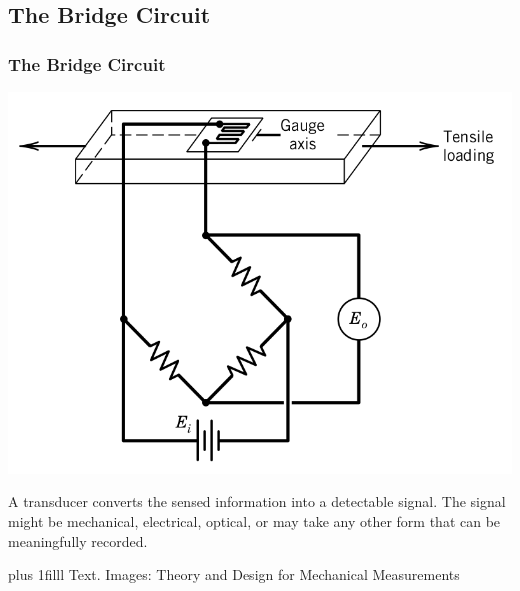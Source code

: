 \documentclass[fleqn]{beamer} %
\newcommand{\sectionIIsubsectionIItitle}{The Bridge Circuit}
\newcommand{\btVFill}{\vskip0pt plus 1filll}
\begin{document}
		\subsection{\sectionIIsubsectionIItitle}\label{sectionIIsubsectionII}

			\begin{frame}
				\frametitle{\sectionIIsubsectionIItitle} \scriptsize
				\bigskip

				\begin{multicols}{2}

				\includegraphics[scale=.25]{images/gauged_beam_bridge.png} \vspace{15mm} 

				A {\PR transducer} converts the sensed information into a detectable signal. The signal might be mechanical, electrical, optical, or may take any other form that can be meaningfully recorded.

				\end{multicols}

				\btVFill
				{\tiny Text. Images: Theory and Design for Mechanical Measurements}

			\end{frame}
\end{document}

